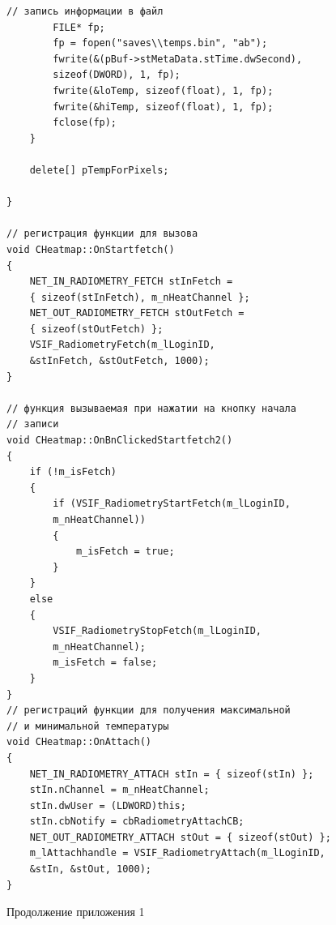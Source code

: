 \documentclass[14pt, a4paper]{extreport}
\begin{document}
\begin{Verbatim}[fontseries=c, fontsize=\fontsize{10pt}{12pt}\selectfont]
		// запись информации в файл
		FILE* fp;
		fp = fopen("saves\\temps.bin", "ab");
		fwrite(&(pBuf->stMetaData.stTime.dwSecond), 
		sizeof(DWORD), 1, fp);
		fwrite(&loTemp, sizeof(float), 1, fp);
		fwrite(&hiTemp, sizeof(float), 1, fp);
		fclose(fp);
	}
	
	delete[] pTempForPixels;
	
}

// регистрация функции для вызова
void CHeatmap::OnStartfetch()
{
	NET_IN_RADIOMETRY_FETCH stInFetch = 
	{ sizeof(stInFetch), m_nHeatChannel };
	NET_OUT_RADIOMETRY_FETCH stOutFetch = 
	{ sizeof(stOutFetch) };
	VSIF_RadiometryFetch(m_lLoginID, 
	&stInFetch, &stOutFetch, 1000);
}

// функция вызываемая при нажатии на кнопку начала 
// записи
void CHeatmap::OnBnClickedStartfetch2()
{
	if (!m_isFetch)
	{
		if (VSIF_RadiometryStartFetch(m_lLoginID, 
		m_nHeatChannel))
		{
			m_isFetch = true;
		}
	}
	else
	{
		VSIF_RadiometryStopFetch(m_lLoginID, 
		m_nHeatChannel);
		m_isFetch = false;
	}
}
// регистраций функции для получения максимальной
// и минимальной температуры
void CHeatmap::OnAttach()
{
	NET_IN_RADIOMETRY_ATTACH stIn = { sizeof(stIn) };
	stIn.nChannel = m_nHeatChannel;
	stIn.dwUser = (LDWORD)this;
	stIn.cbNotify = cbRadiometryAttachCB;
	NET_OUT_RADIOMETRY_ATTACH stOut = { sizeof(stOut) };
	m_lAttachhandle = VSIF_RadiometryAttach(m_lLoginID, 
	&stIn, &stOut, 1000);
}
\end{Verbatim}
\begin{flushright} \noindent Продолжение приложения 1 \end{flushright}
\end{document}
